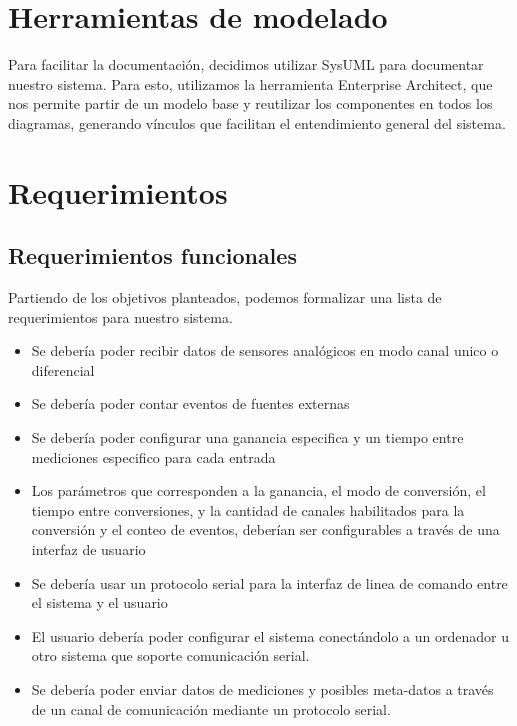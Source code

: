 \section{Herramientas de modelado} %
\label{sec:herramientas_de_modelado}

Para facilitar la documentación, decidimos utilizar SysUML para documentar nuestro sistema. Para esto, utilizamos la herramienta Enterprise Architect, que nos permite partir de un modelo base y reutilizar los componentes en todos los diagramas, generando vínculos que facilitan el entendimiento general del sistema. 


\section{Requerimientos} %
\label{sec:requerimientos}

\subsection{Requerimientos funcionales} %
\label{sub:requerimientos_funcionales}

Partiendo de los objetivos planteados, podemos formalizar una lista de requerimientos para nuestro sistema.

\begin{itemize}
	\item Se debería poder recibir datos de sensores analógicos en modo canal unico o diferencial
	\item Se debería poder contar eventos de fuentes externas
	\item Se debería poder configurar una ganancia especifica y un tiempo entre mediciones especifico para cada entrada
	\item Los parámetros que corresponden a la ganancia, el modo de conversión, el tiempo entre conversiones, y la cantidad de canales habilitados para la conversión y el conteo de eventos, deberían ser configurables a través de una interfaz de usuario
	\item Se debería usar un protocolo serial para la interfaz de linea de comando entre el sistema y el usuario
	\item El usuario debería poder configurar el sistema conectándolo a un ordenador u otro sistema que soporte comunicación serial.
	\item Se debería poder enviar datos de mediciones y posibles meta-datos a través de un canal de comunicación mediante un protocolo serial.
\end{itemize}

